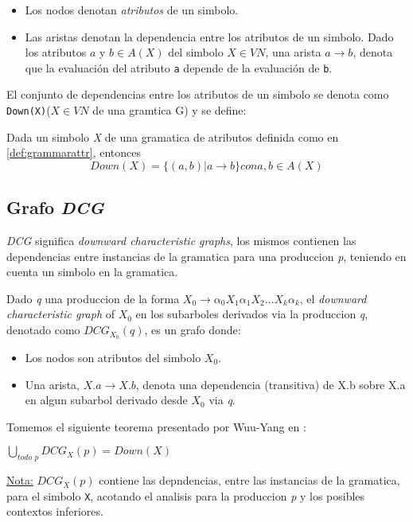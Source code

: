 \begin{itemize}
\item Los nodos denotan \textit{atributos} de un simbolo.
\item Las aristas denotan la dependencia entre los atributos de un simbolo. Dado los atributos $a$ y $b\in A(X)$ del simbolo $X\in VN$, una arista $a\rightarrow b$, denota que la evaluación del atributo \texttt{a} depende de la evaluación de \texttt{b}. 
\end{itemize}
El conjunto de dependencias entre los atributos de un simbolo se denota como  
\texttt{Down(X)}($X\in VN$ de una gramtica G) y se define:
\begin{definition}
Dada un simbolo \textit{X} de una gramatica de atributos definida como en \ref{def:grammarattr}, entonces
\begin{equation}
 Down(X) = \{(a,b) | a \rightarrow b \} con a,b \in A(X)
\end{equation}
\end{definition}
\subsection{Grafo \textit{DCG}}

\textit{DCG} significa \textit{downward characteristic graphs}, los mismos contienen las dependencias entre instancias de la gramatica para una produccion \textit{p}, teniendo en cuenta un simbolo en la gramatica.
\begin{definition}
Dado \textit{q} una produccion de la forma $X_{0}\rightarrow \alpha_{0} X_{1} \alpha_{1} X_{2} \dots X_{k} \alpha_{k}$, el \textit{downward characteristic graph} of $X_{0}$ en los subarboles derivados via la produccion \textit{q}, denotado como $DCG_{X_{0}}(q)$, es un grafo donde: 
\begin{itemize}
\item Los nodos son atributos del simbolo $X_{0}$.
\item Una arista, $X.a \rightarrow X.b$, denota una dependencia (transitiva) de X.b sobre X.a en algun subarbol derivado desde $X_{0}$ via \textit{q}.
\end{itemize}
\end{definition}
Tomemos el siguiente teorema presentado por Wuu-Yang en \cite{wuu-yang1}:
\begin{theorem}
 $\bigcup\limits_{\textit{todo p}}{}{DCG_{X} (p) = Down (X)}$
\end{theorem}
\underline{Nota:} $DCG_{X}(p)$ contiene las depndencias, entre las instancias de la gramatica, para el simbolo \texttt{X}, acotando el analisis para la produccion \textit{p} y los posibles contextos inferiores.


